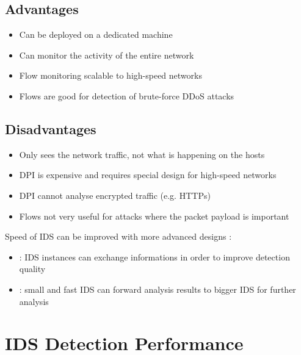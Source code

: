 \begin{minipage}[t]{0.46\textwidth}
    \section{Advantages}
    \begin{itemize}
        \item Can be deployed on a dedicated machine
        \item Can monitor the activity of the entire network
        \item Flow monitoring scalable to high-speed networks
        \item Flows are good for detection of brute-force DDoS attacks
    \end{itemize}
\end{minipage}
\hfill
\begin{minipage}[t]{0.46\textwidth}
    \section{Disadvantages}
    \begin{itemize}
        \item Only sees the network traffic, not what is happening on the hosts
        \item DPI is expensive and requires special design for high-speed networks
        \item DPI cannot analyse encrypted traffic (e.g. HTTPs)
        \item Flows not very useful for attacks where the packet payload is important
    \end{itemize}
\end{minipage}

Speed of IDS can be improved with more advanced designs :

\begin{itemize}
    \item {} : IDS instances can exchange informations in order to improve detection quality
    \item {} : small and fast IDS can forward analysis results to bigger IDS for further analysis
\end{itemize}

\chapter{IDS Detection Performance}

